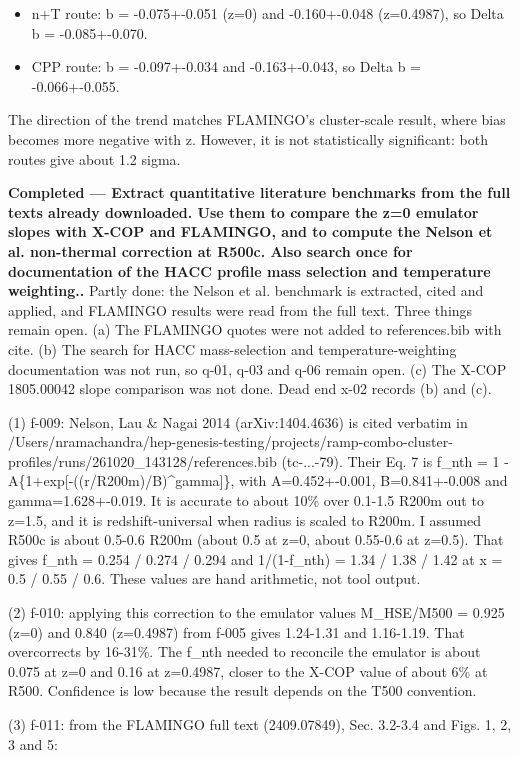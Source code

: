 \documentclass[11pt,a4paper]{article}
\begin{document}
\begin{itemize}
  \item n+T route: b = -0.075+-0.051 (z=0) and -0.160+-0.048 (z=0.4987), so Delta b = -0.085+-0.070.
  \item CPP route: b = -0.097+-0.034 and -0.163+-0.043, so Delta b = -0.066+-0.055.
\end{itemize}
The direction of the trend matches FLAMINGO's cluster-scale result, where bias becomes more negative with z. However, it is not statistically significant: both routes give about 1.2 sigma.

\textbf{Completed --- Extract quantitative literature benchmarks from the full texts already downloaded. Use them to compare the z=0 emulator slopes with X-COP and FLAMINGO, and to compute the Nelson et al. non-thermal correction at R500c. Also search once for documentation of the HACC profile mass selection and temperature weighting..} Partly done: the Nelson et al. benchmark is extracted, cited and applied, and FLAMINGO results were read from the full text. Three things remain open. (a) The FLAMINGO quotes were not added to references.bib with cite. (b) The search for HACC mass-selection and temperature-weighting documentation was not run, so q-01, q-03 and q-06 remain open. (c) The X-COP 1805.00042 slope comparison was not done. Dead end x-02 records (b) and (c).

(1) f-009: Nelson, Lau \& Nagai 2014 (arXiv:1404.4636) is cited verbatim in /Users/nramachandra/hep-genesis-testing/projects/ramp-combo-cluster-profiles/runs/261020\_143128/references.bib (tc-...-79). Their Eq. 7 is f\_nth = 1 - A\{1+exp[-((r/R200m)/B)\textasciicircum{}gamma]\}, with A=0.452+-0.001, B=0.841+-0.008 and gamma=1.628+-0.019. It is accurate to about 10\% over 0.1-1.5 R200m out to z=1.5, and it is redshift-universal when radius is scaled to R200m. I assumed R500c is about 0.5-0.6 R200m (about 0.5 at z=0, about 0.55-0.6 at z=0.5). That gives f\_nth = 0.254 / 0.274 / 0.294 and 1/(1-f\_nth) = 1.34 / 1.38 / 1.42 at x = 0.5 / 0.55 / 0.6. These values are hand arithmetic, not tool output.

(2) f-010: applying this correction to the emulator values M\_HSE/M500 = 0.925 (z=0) and 0.840 (z=0.4987) from f-005 gives 1.24-1.31 and 1.16-1.19. That overcorrects by 16-31\%. The f\_nth needed to reconcile the emulator is about 0.075 at z=0 and 0.16 at z=0.4987, closer to the X-COP value of about 6\% at R500. Confidence is low because the result depends on the T500 convention.

(3) f-011: from the FLAMINGO full text (2409.07849), Sec. 3.2-3.4 and Figs. 1, 2, 3 and 5:
\end{document}

